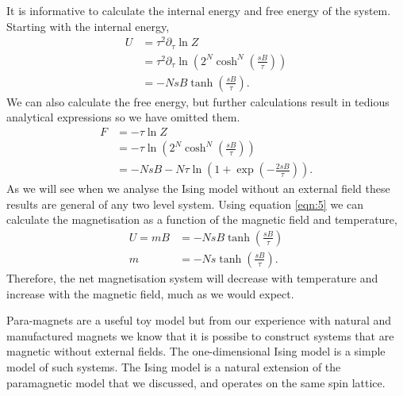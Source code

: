 \documentclass[a4paper]{article}
\begin{document}
\begin{multicols}{2}
        It is informative to calculate the internal energy and free %
        energy of the system. Starting with the internal energy,
        \begin{align}
            U &= \tau^{2}\partial_{\tau}\ln Z\nonumber\\
                &= \tau^{2}\partial_{\tau}\ln\left(2^{N}\cosh^{N}
                    \left(\frac{sB}{\tau}\right)\right)\nonumber\\
                &= -NsB\tanh\left(\frac{sB}{\tau}\right).
            \label{eqn:5}
        \end{align}
        We can also calculate the free energy, but further calculations %
        result in tedious analytical expressions so we have omitted them. %
        \begin{align}
            F &= -\tau\ln Z\nonumber\\
                &= -\tau\ln\left(2^{N}\cosh^{N}\left(\frac{sB}{\tau}
                    \right)\right)\nonumber\\
                &= -NsB - N\tau\ln\left(1 + \exp\left(-\frac{2sB}{\tau}\right)
                    \right).
            \label{eqn:7}
        \end{align}
        As we will see when we analyse the Ising model without an external %
        field these results are general of any two level system. Using %
        equation \ref{eqn:5} we can calculate the magnetisation as a function %
        of the magnetic field and temperature, 
        \begin{align}
            U = mB &= -NsB\tanh\left(\frac{sB}{\tau}\right)\nonumber\\
                m &= -Ns\tanh\left(\frac{sB}{\tau}\right).
            \label{eqn:8}
        \end{align}
        Therefore, the net magnetisation system will decrease with %
        temperature and increase with the magnetic field, much as we %
        would expect. 


        Para-magnets are a useful toy model but from our experience %
        with natural and manufactured magnets we know that it is %
        possibe to construct systems that are magnetic without external %
        fields. The one-dimensional Ising model is a simple model of %
        such systems. The Ising model is a natural extension of the %
        paramagnetic model that we discussed, and operates on the same %
        spin lattice. 



\end{multicols}
\end{document}
